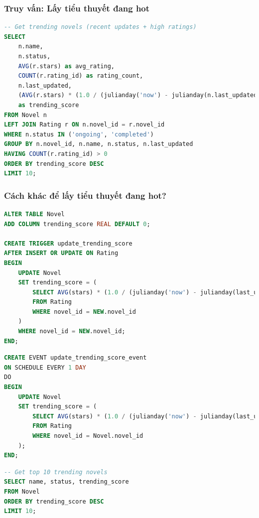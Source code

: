 \documentclass[12pt,aspectratio=169,handout]{beamer}
\begin{document}
\begin{frame}[fragile]
\frametitle{Truy vấn: Lấy tiểu thuyết đang hot}
\begin{lstlisting}[language=SQL, basicstyle=\scriptsize\ttfamily]
-- Get trending novels (recent updates + high ratings)
SELECT 
    n.name, 
    n.status,
    AVG(r.stars) as avg_rating,
    COUNT(r.rating_id) as rating_count,
    n.last_updated,
    (AVG(r.stars) * (1.0 / (julianday('now') - julianday(n.last_updated) + 1))) 
    as trending_score
FROM Novel n
LEFT JOIN Rating r ON n.novel_id = r.novel_id
WHERE n.status IN ('ongoing', 'completed')
GROUP BY n.novel_id, n.name, n.status, n.last_updated
HAVING COUNT(r.rating_id) > 0
ORDER BY trending_score DESC
LIMIT 10;
\end{lstlisting}
\end{frame}

\begin{frame}
\frametitle{Cách khác để lấy tiểu thuyết đang hot?}
\begin{lstlisting}[language=SQL, basicstyle=\footnotesize\ttfamily]
ALTER TABLE Novel
ADD COLUMN trending_score REAL DEFAULT 0;

CREATE TRIGGER update_trending_score
AFTER INSERT OR UPDATE ON Rating
BEGIN
    UPDATE Novel
    SET trending_score = (
        SELECT AVG(stars) * (1.0 / (julianday('now') - julianday(last_updated) + 1))
        FROM Rating
        WHERE novel_id = NEW.novel_id
    )
    WHERE novel_id = NEW.novel_id;
END;
\end{lstlisting}

\framebreak
\begin{lstlisting}[language=SQL, basicstyle=\small\ttfamily]
CREATE EVENT update_trending_score_event
ON SCHEDULE EVERY 1 DAY
DO
BEGIN
    UPDATE Novel
    SET trending_score = (
        SELECT AVG(stars) * (1.0 / (julianday('now') - julianday(last_updated) + 1))
        FROM Rating
        WHERE novel_id = Novel.novel_id
    );
END;
\end{lstlisting}

\framebreak
\begin{lstlisting}[language=SQL, basicstyle=\small\ttfamily]
-- Get top 10 trending novels
SELECT name, status, trending_score
FROM Novel
ORDER BY trending_score DESC
LIMIT 10;
\end{lstlisting}
\end{frame}
\end{document}
